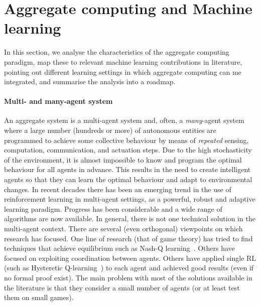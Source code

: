 \documentclass[
  twocolumn,
]{ceurart}
\begin{document}

\section{Aggregate computing and Machine learning}

In this section,
 we analyse the characteristics of the aggregate computing paradigm,
 map these to relevant machine learning contributions in literature,
 pointing out different learning settings in which aggregate computing can me integrated,
 and summarise the analysis into a roadmap.

\paragraph{Multi- and many-agent system}
%
An aggregate system is a multi-agent system
 and, often, a \emph{many}-agent system
 where a large number (hundreds or more)
 of autonomous entities are programmed to achieve 
 some collective behaviour by means of \emph{repeated} 
 sensing, computation, communication, and actuation steps.
%
Due to the high stochasticity of the environment,
 it is almost impossible to know and
 program the optimal behaviour for all agents in advance.
 This results in the need to create intelligent agents
 so that they can learn the optimal behaviour and adapt to environmental changes.
%
In recent decades there has been an emerging trend in the use of reinforcement learning
 in multi-agent settings, as a powerful, robust and adaptive learning paradigm.
 Progress has been considerable and a wide range of algorithms are now available.
In general, there is not one technical solution in the multi-agent context.
 There are several (even orthogonal) viewpoints on which research has focused.
 One line of research (that of game theory) has tried to find techniques that achieve equilibrium such as Nash-Q learning~\cite{nash-q}.
 Others have focused on exploiting coordination between agents. 
 Others have applied single RL (such as Hysteretic Q-learning~\cite{hysteretic-q}) to each agent and achieved good results (even if no formal proof exist).
%
 The main problem with most of the solutions available in the literature is that they consider a small number of agents (or at least test them on small games).
\end{document}
